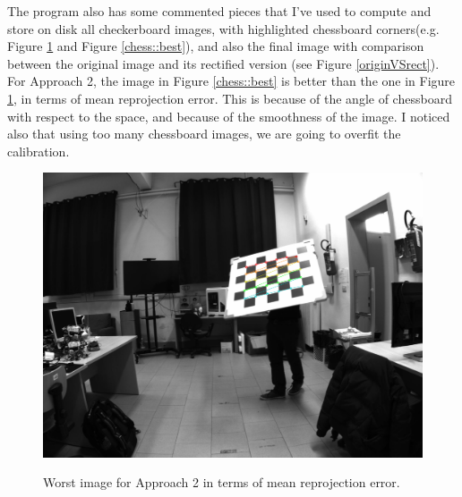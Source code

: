 \documentclass{article}
\begin{document}
\vspace{6cm}
The program also has some commented pieces that I've used to compute and store on disk all checkerboard images, with highlighted chessboard corners(e.g. Figure \ref{chess::worst} and Figure \ref{chess::best}), and also the final image with comparison between the original image and its rectified version (see Figure \ref{originVSrect}).\\
For Approach 2, the image in Figure \ref{chess::best} is better than the one in Figure \ref{chess::worst}, in terms of mean reprojection error. This is because of the angle of chessboard with respect to the space, and because of the smoothness of the image. I noticed also that using too many chessboard images, we are going to overfit the calibration.\\
\begin{figure}[h]
\begin{center}
  \includegraphics[scale=0.17]{chessboard44}\\ 
  \caption{\footnotesize{Worst image for Approach 2 in terms of mean reprojection error.}}\label{chess::worst} 
\end{center} 
\end{figure}
\end{document}
